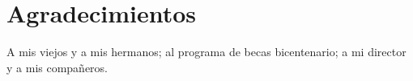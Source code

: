 \chapter*{Agradecimientos}

\noindent A mis viejos y a mis hermanos; al programa de becas bicentenario; a mi director y a mis compañeros.
